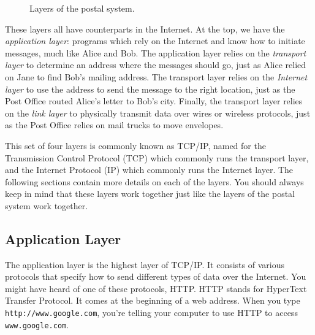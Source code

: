 \begin{figure}
    \centering
    \caption{Layers of the postal system.}
    \label{fig:layer_mail}
\end{figure}

These layers all have counterparts in the Internet. At the top, we have the \emph{application layer}: programs which rely on the Internet and know how to initiate messages, much like Alice and Bob. The application layer relies on the \emph{transport layer} to determine an address where the messages should go, just as Alice relied on Jane to find Bob's mailing address. The transport layer relies on the \emph{Internet layer} to use the address to send the message to the right location, just as the Post Office routed Alice's letter to Bob's city. Finally, the transport layer relies on the \emph{link layer} to physically transmit data over wires or wireless protocols, just as the Post Office relies on mail trucks to move envelopes.

This set of four layers is commonly known as TCP/IP, named for the Transmission Control Protocol (TCP) which commonly runs the transport layer, and the Internet Protocol (IP) which commonly runs the Internet layer. The following sections contain more details on each of the layers. You should always keep in mind that these layers work together just like the layers of the postal system work together.

\subsection{Application Layer}

The application layer is the highest layer of TCP/IP. It consists of various protocols that specify how to send different types of data over the Internet. You might have heard of one of these protocols, HTTP. HTTP stands for HyperText Transfer Protocol. It comes at the beginning of a web address. When you type \texttt{http://www.google.com}, you're telling your computer to use HTTP to access \texttt{www.google.com}.

